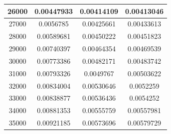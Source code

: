 \begin{center}
\begin{tabular}{| c | c | c | c |}
26000 & 0.00447933 & 0.00414109 & 0.00413046 \\ \hline
27000 & 0.0056785 & 0.00425661 & 0.00433613 \\ \hline
28000 & 0.00589681 & 0.00450222 & 0.00451823 \\ \hline
29000 & 0.00740397 & 0.00464354 & 0.00469539 \\ \hline
30000 & 0.00773386 & 0.00482171 & 0.00483742 \\ \hline
31000 & 0.00793326 & 0.0049767 & 0.00503622 \\ \hline
32000 & 0.00834004 & 0.00530646 & 0.0052259 \\ \hline
33000 & 0.00838877 & 0.00536436 & 0.0054252 \\ \hline
34000 & 0.00881353 & 0.00555759 & 0.00557981 \\ \hline
35000 & 0.00921185 & 0.00573696 & 0.00579729 \\ \hline
\hline
\end{tabular}
\end{center}
